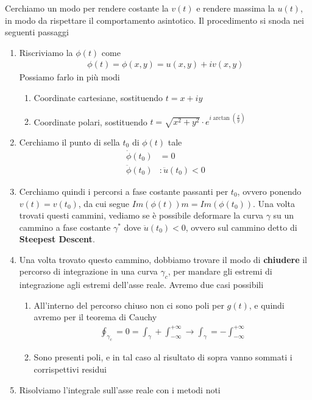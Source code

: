 Cerchiamo un modo per rendere costante la $v(t)$ e rendere massima la $u(t)$, in modo da rispettare il comportamento asintotico.
Il procedimento si snoda nei seguenti passaggi
\begin{enumerate}
	\item Riscriviamo la $\phi(t)$ come
	\begin{align}
		\phi(t) = \phi(x,y) = u(x,y) + iv(x,y)
	\end{align}
	Possiamo farlo in più modi
	\begin{enumerate}
		\item Coordinate cartesiane, sostituendo $t = x + iy$
		\item Coordinate polari, sostituendo $t = \sqrt{x^2 + y^2}\cdot e^{i \arctan \left(\frac{x}{y}\right)}$
	\end{enumerate}
	\item Cerchiamo il punto di sella $t_0$ di $\phi(t)$ tale
	\begin{align}
		\dot{\phi}(t_0) &= 0 \\
		\ddot{\phi}(t_0) &: \ddot{u}(t_0) <0 
	\end{align}
	\item Cerchiamo quindi i percorsi a fase costante passanti per $t_0$, ovvero ponendo $v(t)= v(t_0)$, da cui segue $Im(\phi(t)) m= Im(\phi(t_0))$. Una volta trovati questi cammini, vediamo se è possibile deformare la curva $\gamma$ su un cammino a fase costante $\gamma^*$ dove $\ddot{u}(t_0) <0$, ovvero sul cammino detto di \textbf{Steepest Descent}.
	\item Una volta trovato questo cammino, dobbiamo trovare il modo di \textbf{chiudere} il percorso di integrazione in una curva $\gamma_c$, per mandare gli estremi di integrazione agli estremi dell'asse reale. Avremo due casi possibili
	\begin{enumerate}
		\item All'interno del percorso chiuso non ci sono poli per $g(t)$, e quindi avremo per il teorema di Cauchy
		\begin{align}
			\oint_{\gamma_c} = 0 = \int_\gamma + \int_{-\infty}^{+\infty} \to \int_\gamma = - \int_{-\infty}^{+\infty}
		\end{align}
		\item Sono presenti poli, e in tal caso al risultato di sopra vanno sommati i corrispettivi residui
	\end{enumerate}
	\item Risolviamo l'integrale sull'asse reale con i metodi noti 
	
\end{enumerate}

